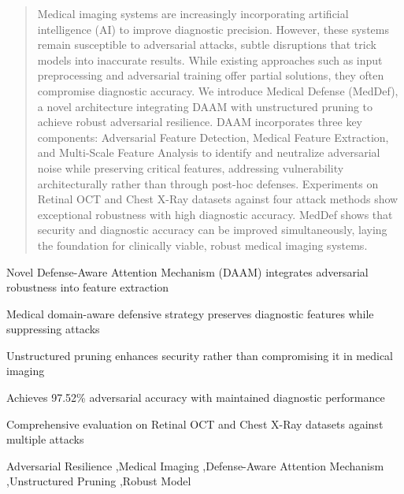 \documentclass[preprint,12pt]{elsarticle}
\begin{document}
\begin{frontmatter}
\begin{abstract}
Medical imaging systems are increasingly incorporating artificial intelligence (AI) to improve diagnostic precision. However, these systems remain susceptible to adversarial attacks, subtle disruptions that trick models into inaccurate results. While existing approaches such as input preprocessing and adversarial training offer partial solutions, they often compromise diagnostic accuracy. We introduce Medical Defense (MedDef), a novel architecture integrating DAAM with unstructured pruning to achieve robust adversarial resilience. DAAM incorporates three key components: Adversarial Feature Detection, Medical Feature Extraction, and Multi-Scale Feature Analysis to identify and neutralize adversarial noise while preserving critical features, addressing vulnerability architecturally rather than through post-hoc defenses. Experiments on Retinal OCT and Chest X-Ray datasets against four attack methods show exceptional robustness with high diagnostic accuracy. MedDef shows that security and diagnostic accuracy can be improved simultaneously, laying the foundation for clinically viable, robust medical imaging systems.
\end{abstract}

\begin{highlights}
\item Novel Defense-Aware Attention Mechanism (DAAM) integrates adversarial robustness into feature extraction
\item Medical domain-aware defensive strategy preserves diagnostic features while suppressing attacks
\item Unstructured pruning enhances security rather than compromising it in medical imaging
\item Achieves 97.52\% adversarial accuracy with maintained diagnostic performance
\item Comprehensive evaluation on Retinal OCT and Chest X-Ray datasets against multiple attacks
\end{highlights}

\begin{keyword}
Adversarial Resilience \sep Medical Imaging \sep Defense-Aware Attention Mechanism \sep Unstructured Pruning \sep Robust Model


\end{keyword}

\end{frontmatter}
\end{document}
